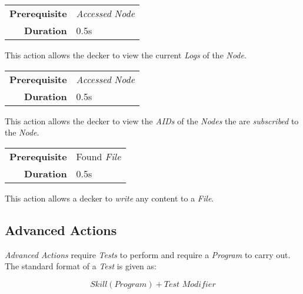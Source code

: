\label{par:view logs}


\begin{tabular}{rl}
    \textbf{Prerequisite} & \emph{Accessed} \emph{Node} \\
    \textbf{Duration}     & 0.5s                        \\
\end{tabular}

\hfill

This action allows the decker to view the current \emph{Logs} of the
\emph{Node}.

\label{par:view subscriptions}


\begin{tabular}{rl}
    \textbf{Prerequisite} & \emph{Accessed} \emph{Node} \\
    \textbf{Duration}     & 0.5s                        \\
\end{tabular}

\hfill

This action allows the decker to view the \emph{AIDs} of the \emph{Nodes} the are
\emph{subscribed} to the \emph{Node}.

\label{par:write file}


\begin{tabular}{rl}
    \textbf{Prerequisite} & Found \emph{File} \\
    \textbf{Duration}     & 0.5s              \\
\end{tabular}

\hfill

This action allows a decker to \emph{write} any content to a \emph{File}.

\subsection{Advanced Actions}

\emph{Advanced Actions} require \emph{Tests} to perform and require a \emph{Program}
to carry out. The standard format of a \emph{Test} is given as:

\begin{equation*}
    \textit{Skill}(\textit{Program}) + \textit{Test Modifier}
\end{equation*}

\label{par:analyze}


